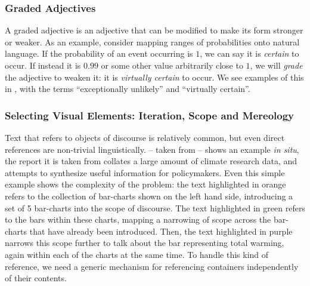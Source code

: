 \subsubsection{Graded Adjectives}
A graded adjective is an adjective that can be modified to make its form stronger or weaker.
As an example, consider mapping ranges of probabilities onto natural language. If the probability
of an event occurring is $1$, we can say it is \emph{certain} to occur. If instead it is $0.99$
or some other value arbitrarily close to $1$, we will \emph{grade} the adjective to weaken it:
it is \emph{virtually certain} to occur. We see examples of this in ,
with the terms ``exceptionally unlikely'' and ``virtually certain''.


\subsubsection{Selecting Visual Elements: Iteration, Scope and Mereology}
Text that refers to objects of discourse is relatively common, but even direct references are non-trivial 
linguistically.  -- taken from \cite{lee23} -- shows an example \textit{in situ},
the report it is taken from collates a large amount of climate research data, and attempts to synthesize
useful information for policymakers. Even this simple example shows the complexity of the problem: the text highlighted
in orange refers to the collection of bar-charts shown on the left hand side, introducing a set of 5 bar-charts
into the scope of discourse. The text highlighted in green refers to the bars within these charts, mapping 
a narrowing of scope across the bar-charts that have already been introduced. Then, the text highlighted in
purple narrows this scope further to talk about the bar representing total warming, again within each of the
charts at the same time. To handle this kind of reference, we need a generic mechanism for referencing
containers independently of their contents.

